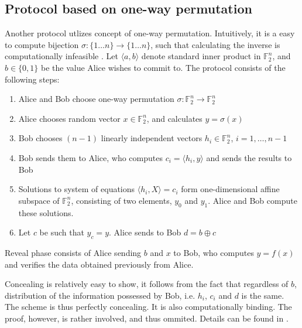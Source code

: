 \documentclass[10pt]{article}
\begin{document}

\subsection{Protocol based on one-way permutation} 

Another protocol utlizes concept of one-way permutation. Intuitively, it is a easy to compute
bijection \(\sigma\colon \{1\ldots n\}\rightarrow \{1\ldots n\}\), such that calculating the
inverse is computationally infeasible \footnotemark. Let \(\langle a,b\rangle\) denote standard
inner product in \(\mathbb{F}_2^n\), and \(b\in\{0,1\}\) be the value Alice wishes to commit to.
The protocol consists of the following steps:


\begin{enumerate}
  \item Alice and Bob choose one-way permutation \(\sigma\colon \mathbb{F}_2^n\rightarrow 
    \mathbb{F}_2^n\)
  \item Alice chooses random vector \(x\in\mathbb{F}_2^n\), and calculates \(y=\sigma(x)\)
  \item Bob chooses \((n-1)\) linearly independent vectors \(h_i\in\mathbb{F}_2^n\), 
    \(i=1,\ldots, n-1\)
  \item Bob sends them to Alice, who computes \(c_i=\langle h_i, y\rangle\) and sends the results to Bob
  \item Solutions to system of equations \(\langle h_i, X\rangle = c_i\) form one-dimensional
    affine subspace of \(\mathbb{F}_2^n\), consisting of two elements, \(y_0\) and \(y_1\). Alice
    and Bob compute these solutions.\footnotemark
  \item Let \(c\) be such that \(y_c = y\). Alice sends to Bob \(d=b\oplus c\)
\end{enumerate}

Reveal phase consists of Alice sending \(b\) and \(x\) to Bob, who computes \(y=f(x)\) and verifies
the data obtained previously from Alice.

Concealing is relatively easy to show, it follows from the fact that regardless of \(b\), distribution
of the information possessed by Bob, i.e. \(h_i\), \(c_i\) and \(d\) is the same. The scheme is thus
perfectly concealing. It is also computationally binding. The proof, however, is rather involved, and 
thus ommited. Details can be found in \cite{Naor98}.
\end{document}
